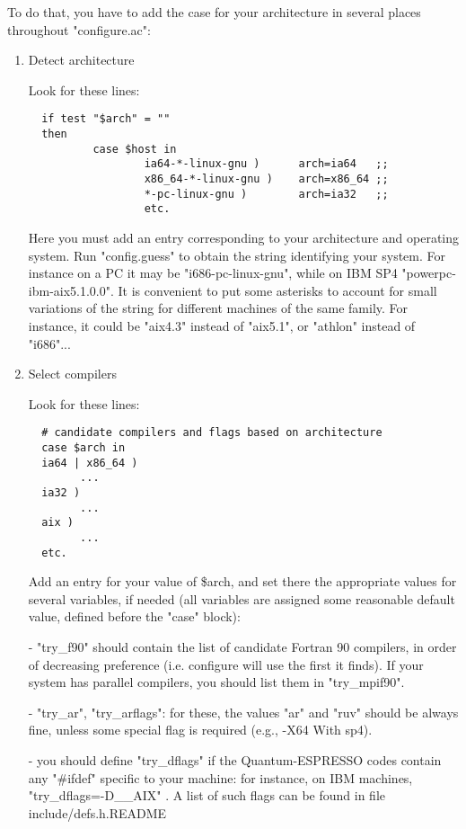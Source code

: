 \documentclass[12pt,a4paper]{article}
\begin{document}
To do that, you have to add the case for your architecture in several
places throughout "configure.ac":
\begin{enumerate}
\item Detect architecture

Look for these lines:
\begin{verbatim}
  if test "$arch" = ""
  then
          case $host in
                  ia64-*-linux-gnu )      arch=ia64   ;;
                  x86_64-*-linux-gnu )    arch=x86_64 ;;
                  *-pc-linux-gnu )        arch=ia32   ;;
                  etc.
\end{verbatim}
Here you must add an entry corresponding to your architecture and
operating system.  Run "config.guess" to obtain the string identifying
your system.
For instance on a PC it may be "i686-pc-linux-gnu", while on IBM SP4
"powerpc-ibm-aix5.1.0.0".  It is convenient to put some asterisks to
account for small variations of the string for different machines of
the same family.  For instance, it could be "aix4.3" instead of
"aix5.1", or "athlon" instead of "i686"...

\item  Select compilers

Look for these lines:

\begin{verbatim}
  # candidate compilers and flags based on architecture
  case $arch in
  ia64 | x86_64 )
        ...
  ia32 )
        ...
  aix )
        ...
  etc.
\end{verbatim}

Add an entry for your value of \$arch, and set there the appropriate
values for several variables, if needed (all variables are assigned
some reasonable default value, defined before the "case" block):

- "try\_f90" should contain the list of candidate Fortran 90 compilers,
in order of decreasing preference (i.e. configure will use the first
it finds).  If your system has parallel compilers, you should list
them in "try\_mpif90".

- "try\_ar", "try\_arflags": for these, the values "ar" and "ruv" should
be always fine, unless some special flag is required (e.g., -X64
With sp4).  

- you should define "try\_dflags" if the Quantum-ESPRESSO codes contain any
"\#ifdef" specific to your machine: for instance, on IBM machines,
"try\_dflags=-D\_\_AIX" . A list of such flags can be found in file 
include/defs.h.README


\end{enumerate}
\end{document}
